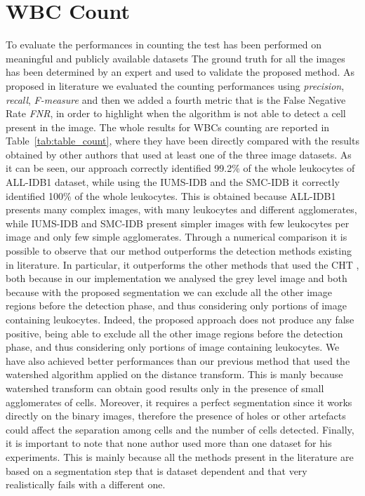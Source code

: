 \documentclass[final,a4paper,12pt,english]{UnicaPhdThesis3}
\begin{document}
\section{WBC Count} %
To evaluate the performances in counting the test has been performed on meaningful and publicly available datasets
The ground truth for all the images has been determined by an expert and used to validate the proposed method. As proposed in literature we evaluated the counting performances using \textit{precision}, \textit{recall}, \textit{F-measure} and then we added a fourth metric that is the False Negative Rate \textit{FNR}, in order to highlight when the algorithm is not able to detect a cell present in the image. The whole results for WBCs counting are reported in Table~\ref{tab:table_count}, where they have been directly compared with the results obtained by other authors that used at least one of the three image datasets. As it can be seen, our approach correctly identified 99.2\% of the whole leukocytes of ALL-IDB1 dataset, while using the IUMS-IDB and the SMC-IDB it correctly identified 100\% of the whole leukocytes. This is obtained because ALL-IDB1 presents many complex images, with many leukocytes and different agglomerates, while IUMS-IDB and SMC-IDB present simpler images with few leukocytes per image and only few simple agglomerates. Through a numerical comparison it is possible to observe that our method outperforms the detection methods existing in literature. In particular, it outperforms the other methods that used the CHT \cite{Mahmood,Alomari}, both because in our implementation we analysed the grey level image and both because with the proposed segmentation we can exclude all the other image regions before the detection phase, and thus considering only portions of image containing leukocytes. Indeed, the proposed approach does not produce any false positive, being able to exclude all the other image regions before the detection phase, and thus considering only portions of image containing leukocytes. We have also achieved better performances than our previous method \cite{Put14b} that used the watershed  algorithm applied on the distance transform. This is manly because watershed transform can obtain good results only in the presence of small agglomerates of cells. Moreover, it requires a perfect segmentation since it works directly on the binary images, therefore the presence of holes or other artefacts could affect the separation among cells and the number of cells detected. Finally, it is important to note that none author used more than one dataset for his experiments. This is mainly because all the methods present in the literature are based on a segmentation step that is dataset dependent and that very realistically fails with a different one.
\end{document}
